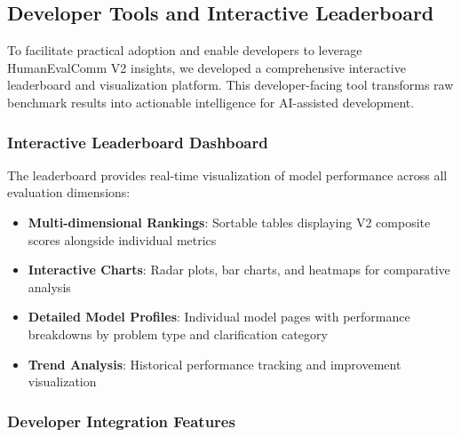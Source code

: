 \documentclass[conference]{IEEEtran}
\begin{document}
\subsection{Developer Tools and Interactive Leaderboard}

To facilitate practical adoption and enable developers to leverage HumanEvalComm V2 insights, we developed a comprehensive interactive leaderboard and visualization platform. This developer-facing tool transforms raw benchmark results into actionable intelligence for AI-assisted development.

\subsubsection{Interactive Leaderboard Dashboard}

The leaderboard provides real-time visualization of model performance across all evaluation dimensions:

\begin{itemize}
    \item \textbf{Multi-dimensional Rankings}: Sortable tables displaying V2 composite scores alongside individual metrics
    \item \textbf{Interactive Charts}: Radar plots, bar charts, and heatmaps for comparative analysis
    \item \textbf{Detailed Model Profiles}: Individual model pages with performance breakdowns by problem type and clarification category
    \item \textbf{Trend Analysis}: Historical performance tracking and improvement visualization
\end{itemize}





\subsubsection{Developer Integration Features}
\end{document}
